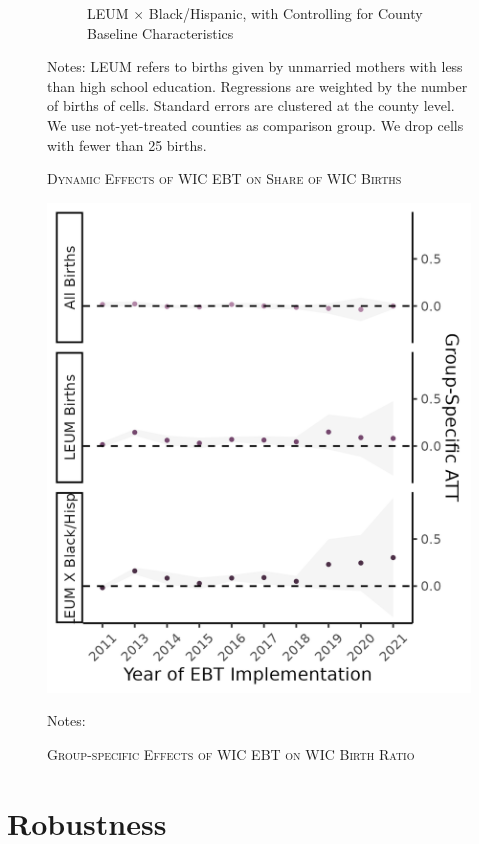 \begin{figure}[!htbp]
\begin{subfigure}[t]{.325\textwidth}
		\caption{LEUM $\times$ Black/Hispanic, with Controlling for County Baseline Characteristics}
		\label{cs_es3}
	\end{subfigure}
	\caption{\textsc{Dynamic Effects of WIC EBT on Share of WIC Births}}
	\label{cs_es}
	\footnotesize
	\vspace{6pt}
	\vspace{4pt}
	Notes: LEUM refers to births given by unmarried mothers with less than high school education. Regressions are weighted by the number of births of cells. Standard errors are clustered at the county level. We use not-yet-treated counties as comparison group. We drop cells with fewer than 25 births.
\end{figure}

\begin{figure}
	\begin{center}
		\includegraphics[width=.6\textwidth]{group_att.png}  
		\caption{\textsc{Group-specific Effects of WIC EBT on WIC Birth Ratio}}
		\label{group_att}
	\end{center}
	\footnotesize
	Notes: 
\end{figure}

\section{Robustness}

